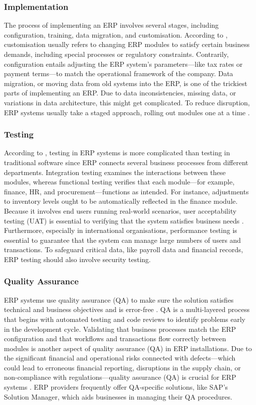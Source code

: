 \subsubsection{Implementation}
\par{The process of implementing an ERP involves several stages, including configuration, training, data migration, and customisation. According to \cite{zhang2003critical}, customisation usually refers to changing ERP modules to satisfy certain business demands, including special processes or regulatory constraints. Contrarily, configuration entails adjusting the ERP system's parameters—like tax rates or payment terms—to match the operational framework of the company. Data migration, or moving data from old systems into the ERP, is one of the trickiest parts of implementing an ERP. Due to data inconsistencies, missing data, or variations in data architecture, this might get complicated. To reduce disruption, ERP systems usually take a staged approach, rolling out modules one at a time \citep{shanks2000model}. }
\subsubsection{Testing}
\par{According to \cite{ahmad2013critical}, testing in ERP systems is more complicated than testing in traditional software since ERP connects several business processes from different departments. Integration testing examines the interactions between these modules, whereas functional testing verifies that each module—for example, finance, HR, and procurement—functions as intended. For instance, adjustments to inventory levels ought to be automatically reflected in the finance module. Because it involves end users running real-world scenarios, user acceptability testing (UAT) is essential to verifying that the system satisfies business needs \citep{nah2001critical}. Furthermore, especially in international organisations, performance testing is essential to guarantee that the system can manage large numbers of users and transactions. To safeguard critical data, like payroll data and financial records, ERP testing should also involve security testing.}
\subsubsection{Quality Assurance}
\par{ERP systems use quality assurance (QA) to make sure the solution satisfies technical and business objectives and is error-free \citep{hawari2010explaining}. QA is a multi-layered process that begins with automated testing and code reviews to identify problems early in the development cycle. Validating that business processes match the ERP configuration and that workflows and transactions flow correctly between modules is another aspect of quality assurance (QA) in ERP installations. Due to the significant financial and operational risks connected with defects—which could lead to erroneous financial reporting, disruptions in the supply chain, or non-compliance with regulations—quality assurance (QA) is crucial for ERP systems \citep{hawking2004revisiting}. ERP providers frequently offer QA-specific solutions, like SAP's Solution Manager, which aids businesses in managing their QA procedures.}
